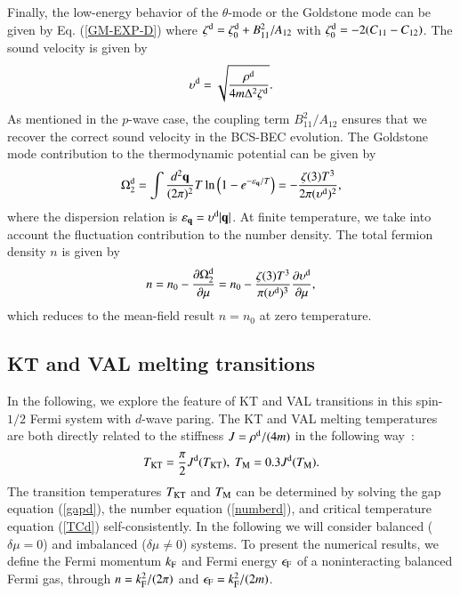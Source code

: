\documentclass[aps,prd,amsmath,two column,nofootinbib,amssymb,referee]{revtex4}
\begin{document}
Finally, the low-energy behavior of the $\theta$-mode or the Goldstone mode can be given by Eq. (\ref{GM-EXP-D})
where $\zeta^{\rm d}=\zeta_0^{\rm d}+B_{11}^2/A_{12}$ with $\zeta_0^{\rm d}=-2(C_{11}-C_{12})$. The sound velocity is given by 
\begin{eqnarray}
\upsilon^{\rm d}=\sqrt{{\rho^{\rm d}\over 4m\Delta^2\zeta^{\rm d}}}.
\end{eqnarray}
As mentioned in the $p$-wave case, the coupling term $B_{11}^2/A_{12}$ ensures that we recover the correct sound velocity in the BCS-BEC evolution.
The Goldstone mode contribution to the thermodynamic potential can be given by
\begin{eqnarray}
\Omega_2^{\rm d}=\int{d^2{\bf q}\over(2\pi)^2}T\ln\Big(1-e^{-\varepsilon_{\bf q}/T}\Big)=-{\zeta(3)T^3\over2\pi(\upsilon^{\rm d})^2},
\end{eqnarray}
where the dispersion relation is $\varepsilon_{\bf q}=\upsilon^{\rm d}|{\bf q}|$. At finite temperature, we take into account the fluctuation contribution to the number density. 
The total fermion density $n$ is given by
\begin{eqnarray}\label{numberd}
n=n_0-{\partial \Omega_2^{\rm d}\over{\partial\mu}}=n_0-{\zeta(3)T^3\over\pi(\upsilon^{\rm d})^3}{\partial\upsilon^{\rm d}\over\partial\mu},
\end{eqnarray}
which reduces to the mean-field result $n=n_0$ at zero temperature.

\subsection{KT and VAL melting transitions}\label{sectiondB}
In the following, we explore the feature of KT and VAL transitions in this spin-$1/2$ Fermi system with $d$-wave paring. The KT and VAL melting temperatures are both directly related to the stiffness $J=\rho^{\rm d}/(4m)$ in the following way~\cite{BKT,Nelson1979,Young,Botelho2006}:
\begin{eqnarray}\label{TCd}
T_{\rm KT}={\pi\over2}J^{\rm d}(T_{\rm KT}),\ T_{\rm M}=0.3J^{\rm d}(T_{\rm M}).
\end{eqnarray}
The transition temperatures $T_{\rm KT}$ and $T_{\rm M}$ can be determined by solving the gap equation (\ref{gapd}), the number equation (\ref{numberd}), and critical temperature equation (\ref{TCd})  self-consistently.  In the following we will consider balanced ($\delta\mu=0$) and imbalanced ($\delta\mu\neq0$) systems. To present the numerical results, we define the Fermi momentum $k_{\rm F}$ and Fermi energy $\epsilon_{\rm F}$ of a noninteracting balanced Fermi gas, through $n=k_{\rm F}^2/(2\pi)$ and $\epsilon_{\rm F}=k_{\rm F}^2/(2m)$. 
\end{document}
